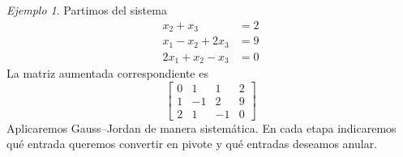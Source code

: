 \documentclass[12pt]{article}
\theoremstyle{remark}
\newtheorem{Ejem}[definicion]{Ejemplo}
\begin{document}
\begin{Ejem}

Partimos del sistema
\[
\begin{aligned}
x_{2} + x_{3} &= 2\\
x_{1} - x_{2} + 2 x_{3} &= 9\\
2 x_{1} + x_{2} - x_{3} &= 0
\end{aligned}
\]
La matriz aumentada correspondiente es
\[
\left[\begin{array}{ccc|c}
0 & 1 & 1 & 2\\
1 & -1 & 2 & 9\\
2 & 1 & -1 & 0
\end{array}\right]
\]
Aplicaremos Gauss--Jordan de manera sistemática. En cada etapa indicaremos qué entrada queremos convertir en pivote y qué entradas deseamos anular.



\end{Ejem}
\end{document}

